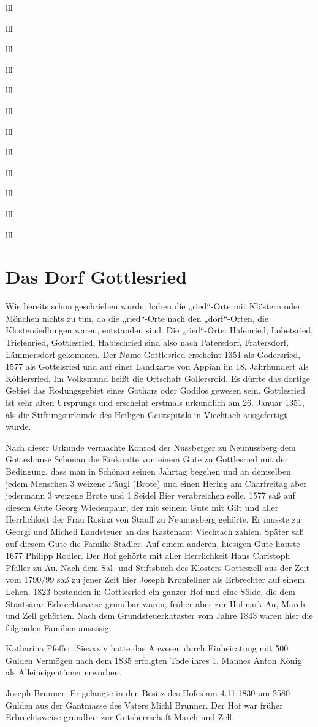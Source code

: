 \documentclass[12pt,a4pager]{book}
\begin{document}
\begin{tabuluar}{lll}
\begin{tabuluar}{lll}
\begin{tabuluar}{lll}
\begin{tabuluar}{lll}
\begin{tabuluar}{lll}
\begin{tabuluar}{lll}
\begin{tabuluar}{lll}
\begin{tabuluar}{lll}
\begin{tabuluar}{lll}
\begin{tabuluar}{lll}
\begin{tabuluar}{lll}
\begin{tabuluar}{lll}
\section{Das Dorf Gottlesried}

Wie bereits schon geschrieben wurde, haben die „ried“-Orte mit Klöstern oder
Mönchen nichts zu tun, da die „ried“-Orte nach den „dorf“-Orten, die
Klostersiedlungen waren, entstanden sind. Die „ried“-Orte: Hafenried,
Lobetsried, Triefenried, Gottlesried, Habischried sind also nach Patersdorf,
Fratersdorf, Lämmersdorf gekommen. Der Name Gottlesried erscheint 1351 als
Godersried, 1577 als Gottelsried und auf einer Landkarte von Appian im 18.
Jahrhundert als Köhlersried. Im Volksmund heißt die Ortschaft Gollersroid. Es
dürfte das dortige Gebiet das Rodungsgebiet eines Gothars oder Godilos gewesen
sein. Gottlesried ist sehr alten Ursprungs und erscheint erstmals urkundlich am
26. Januar 1351, als die Stiftungsurkunde des Heiligen-Geistspitals in Viechtach
ausgefertigt wurde.

Nach dieser Urkunde vermachte Konrad der Nussberger zu Neunussberg dem
Gotteshause Schönau die Einkünfte von einem Gute zu Gottlesried mit der
Bedingung, dass man in Schönau seinen Jahrtag begehen und an demselben jedem
Menschen 3 weizene Päugl (Brote) und einen Hering am Charfreitag aber jedermann
3 weizene Brote und 1 Seidel Bier verabreichen solle. 1577 saß auf diesem Gute
Georg Wiedenpaur, der mit seinem Gute mit Gilt und aller Herrlichkeit der Frau
Rosina von Stauff zu Neunussberg gehörte. Er musste zu Georgi und Micheli
Landsteuer an das Kastenamt Viechtach zahlen. Später saß auf diesem Gute die
Familie Stadler. Auf einem anderen, hiesigen Gute hauste 1677 Philipp Rodler.
Der Hof gehörte mit aller Herrlichkeit Hans Christoph Pfaller zu Au. Nach dem
Sal- und Stiftsbuch des Klosters Gotteszell aus der Zeit vom 1790/99 saß zu
jener Zeit hier Joseph Kronfellner als Erbrechter auf einem Lehen. 1823
bestanden in Gottlesried ein ganzer Hof und eine Sölde, die dem Staatsärar
Erbrechtsweise grundbar waren, früher aber zur Hofmark Au, March und Zell
gehörten. Nach dem Grundsteuerkataster vom Jahre 1843 waren hier die folgenden
Familien ansässig:

Katharina Pfeffer: Siexxxiv hatte das Anwesen durch Einheiratung mit 500 Gulden
Vermögen nach dem 1835 erfolgten Tode ihres 1. Mannes Anton König als
Alleineigentümer erworben.

Joseph Brunner: Er gelangte in den Besitz des Hofes am 4.11.1830 um 2580 Gulden
aus der Gantmasse des Vaters Michl Brunner. Der Hof war früher Erbrechtsweise
grundbar zur Gutsherrschaft March und Zell.


\end{tabuluar}
\end{tabuluar}
\end{tabuluar}
\end{tabuluar}
\end{tabuluar}
\end{tabuluar}
\end{tabuluar}
\end{tabuluar}
\end{tabuluar}
\end{tabuluar}
\end{tabuluar}
\end{tabuluar}
\end{document}
